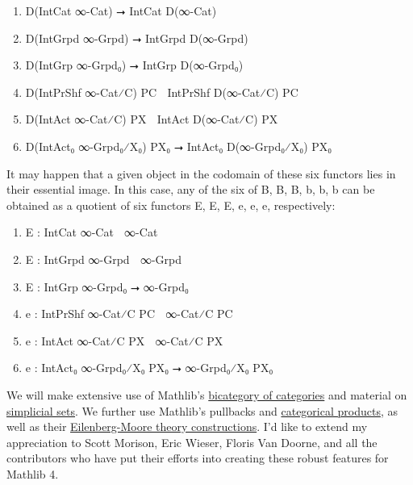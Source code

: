 \documentclass{book}
\theoremstyle{definition}
\begin{document}
\begin{enumerate}
\item D(IntCat ∞-Cat) ⭢ IntCat D(∞-Cat)
\item D(IntGrpd ∞-Grpd) ⭢ IntGrpd D(∞-Grpd)
\item D(IntGrp ∞-Grpd₀) ⭢ IntGrp D(∞-Grpd₀)
\item D(IntPrShf ∞-Cat⁄C) P⃗C ⭢ IntPrShf D(∞-Cat⁄C) P⃗C
\item D(IntAct ∞-Cat⁄C) P⃡X ⭢ IntAct D(∞-Cat⁄C) P⃡X
\item D(IntAct₀ ∞-Grpd₀⁄X₀) PX₀ ⭢ IntAct₀ D(∞-Grpd₀⁄X₀) PX₀
\end{enumerate}

It may happen that a given object in the codomain of these six functors lies in their essential image. In this case, any of the six of B⃗, B⃡, B, b⃗, b⃡, b can be obtained as a quotient of six functors E⃗, E⃡, E, e⃗, e⃡, e, respectively:

\begin{enumerate}
\item E⃗ : IntCat ∞-Cat ⭢ ∞-Cat
\item E⃡ : IntGrpd ∞-Grpd ⭢ ∞-Grpd
\item E : IntGrp ∞-Grpd₀ ⭢ ∞-Grpd₀
\item e⃗ : IntPrShf ∞-Cat⁄C P⃗C ⭢ ∞-Cat⁄C P⃗C
\item e⃡ : IntAct ∞-Cat⁄C P⃡X ⭢ ∞-Cat⁄C P⃡X
\item e : IntAct₀ ∞-Grpd₀⁄X₀ PX₀ ⭢ ∞-Grpd₀⁄X₀ PX₀
\end{enumerate}

We will make extensive use of Mathlib's \href{https://leanprover-community.github.io/mathlib4_docs/Mathlib/CategoryTheory/Category/Cat.html#CategoryTheory.Cat.bicategory}{bicategory of categories} and material on \href{https://github.com/leanprover-community/mathlib4/blob/bd3e369b6f82c874de0f318c71d7e0595f8a3aa4//Mathlib/AlgebraicTopology/SimplicialSet.lean#L47-L48}{simplicial sets}. We further use Mathlib's pullbacks and \href{https://github.com/leanprover-community/mathlib4/blob/bd3e369b6f82c874de0f318c71d7e0595f8a3aa4/Mathlib/CategoryTheory/Products/Basic.lean}{categorical products}, as well as their \href{https://github.com/leanprover-community/mathlib4/blob/bd3e369b6f82c874de0f318c71d7e0595f8a3aa4/Mathlib/CategoryTheory/Monad/Algebra.lean}{Eilenberg-Moore theory constructions}. I'd like to extend my appreciation to Scott Morison, Eric Wieser, Floris Van Doorne, and all the contributors who have put their efforts into creating these robust features for Mathlib 4.\\
\end{document}
